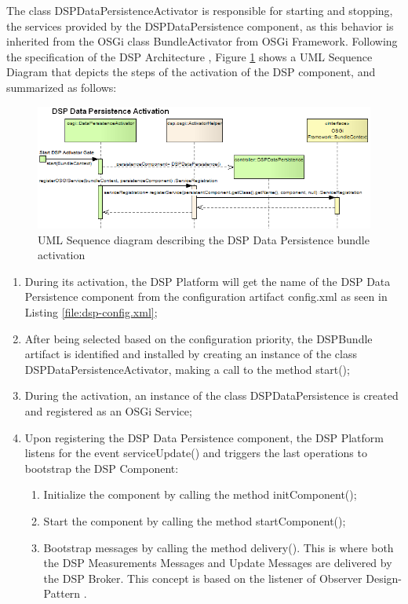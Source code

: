 The class DSPDataPersistenceActivator is responsible for starting and stopping,
the services provided by the DSPDataPersistence component, as this behavior is
inherited from the OSGi class BundleActivator from OSGi Framework. Following
the specification of the DSP Architecture \cite{netbeams-dsp-architecture},
Figure
\ref{fig:From-OSGi-Framework-to-DSP-Data-PersistenceActivator-Sequence-Diagram} 
shows a UML Sequence Diagram that depicts the steps of the activation of the
DSP component, and summarized as follows:

\begin{figure}[!h]
  \centering
  \includegraphics[scale=0.65]{../diagrams/From-OSGi-Framework-to-DSP-Data-PersistenceActivator-Sequence-Diagram}
  \caption{UML Sequence diagram describing the DSP Data Persistence bundle activation}
  \label{fig:From-OSGi-Framework-to-DSP-Data-PersistenceActivator-Sequence-Diagram}
\end{figure}

\begin{enumerate}
  \item During its activation, the DSP Platform will get the name of the
  DSP Data Persistence component from the configuration artifact config.xml as
  seen in Listing \ref{file:dsp-config.xml};
  \item After being selected based on the configuration priority, the 
  DSPBundle artifact is identified and installed by creating an instance of the
  class DSPDataPersistenceActivator, making a call to the method start();
  \item During the activation, an instance of the class DSPDataPersistence
  is created and registered as an OSGi Service;
  \item Upon registering the DSP Data Persistence component, the DSP Platform
  listens for the event serviceUpdate() and triggers the last operations to
  bootstrap the DSP Component:
   \begin{enumerate}
      \item Initialize the component by calling the method initComponent();
      \item Start the component by calling the method startComponent();
      \item Bootstrap messages by calling the method delivery(). This is where
      both the DSP Measurements Messages and Update Messages are delivered by
      the DSP Broker. This concept is based on the listener of Observer
      Design-Pattern \cite{gof}.
   \end{enumerate}
\end{enumerate}

